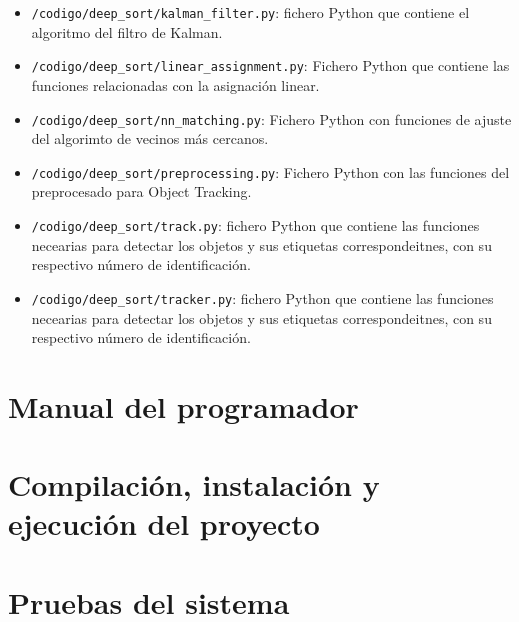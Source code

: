 \begin{itemize}
    \item \texttt{/codigo/deep\_sort/kalman\_filter.py}: fichero Python que contiene el algoritmo del filtro de Kalman\cite{kalman_filter}.  
    \item \texttt{/codigo/deep\_sort/linear\_assignment.py}: Fichero Python que contiene las funciones relacionadas con la asignación linear.
    \item \texttt{/codigo/deep\_sort/nn\_matching.py}: Fichero Python con funciones de ajuste del algorimto de vecinos más cercanos\cite{knn}.
    \item \texttt{/codigo/deep\_sort/preprocessing.py}: Fichero Python con las funciones del preprocesado para Object Tracking.
    \item \texttt{/codigo/deep\_sort/track.py}: fichero Python que contiene las funciones necearias para detectar los objetos y sus etiquetas correspondeitnes, con su respectivo número de identificación.
    \item \texttt{/codigo/deep\_sort/tracker.py}: fichero Python que contiene las funciones necearias para detectar los objetos y sus etiquetas correspondeitnes, con su respectivo número de identificación.     
\end{itemize}

\section{Manual del programador}

\section{Compilación, instalación y ejecución del proyecto}

\section{Pruebas del sistema}
